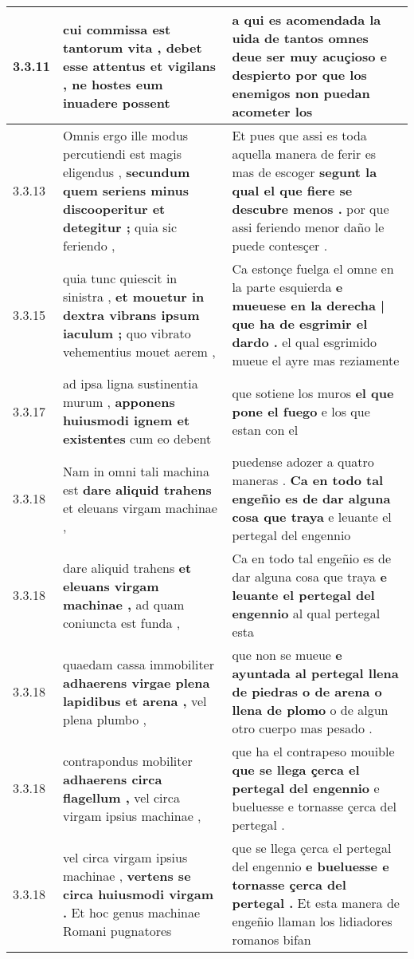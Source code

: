 \begin{tabular}{|p{1cm}|p{6.5cm}|p{6.5cm}|}
3.3.11 & cui commissa est tantorum vita , \textbf{ debet esse attentus et vigilans , } ne hostes eum inuadere possent & a qui es acomendada la uida de tantos omnes \textbf{ deue ser muy acuçioso e despierto } por que los enemigos non puedan acometer los \\\hline
3.3.13 & Omnis ergo ille modus percutiendi est magis eligendus , \textbf{ secundum quem seriens minus discooperitur et detegitur ; } quia sic feriendo , & Et pues que assi es toda aquella manera de ferir es mas de escoger \textbf{ segunt la qual el que fiere se descubre menos . } por que assi feriendo menor daño le puede contesçer . \\\hline
3.3.15 & quia tunc quiescit in sinistra , \textbf{ et mouetur in dextra vibrans ipsum iaculum ; } quo vibrato vehementius mouet aerem , & Ca estonçe fuelga el omne en la parte esquierda \textbf{ e mueuese en la derecha | que ha de esgrimir el dardo . } el qual esgrimido mueue el ayre mas reziamente \\\hline
3.3.17 & ad ipsa ligna sustinentia murum , \textbf{ apponens huiusmodi ignem et existentes } cum eo debent & que sotiene los muros \textbf{ el que pone el fuego } e los que estan con el \\\hline
3.3.18 & Nam in omni tali machina est \textbf{ dare aliquid trahens } et eleuans virgam machinae , & puedense adozer a quatro maneras . \textbf{ Ca en todo tal engeñio es de dar alguna cosa que traya } e leuante el pertegal del engennio \\\hline
3.3.18 & dare aliquid trahens \textbf{ et eleuans virgam machinae , } ad quam coniuncta est funda , & Ca en todo tal engeñio es de dar alguna cosa que traya \textbf{ e leuante el pertegal del engennio } al qual pertegal esta \\\hline
3.3.18 & quaedam cassa immobiliter \textbf{ adhaerens virgae plena lapidibus et arena , } vel plena plumbo , & que non se mueue \textbf{ e ayuntada al pertegal llena de piedras o de arena o llena de plomo } o de algun otro cuerpo mas pesado . \\\hline
3.3.18 & contrapondus mobiliter \textbf{ adhaerens circa flagellum , } vel circa virgam ipsius machinae , & que ha el contrapeso mouible \textbf{ que se llega çerca el pertegal del engennio } e bueluesse e tornasse çerca del pertegal . \\\hline
3.3.18 & vel circa virgam ipsius machinae , \textbf{ vertens se circa huiusmodi virgam . } Et hoc genus machinae Romani pugnatores & que se llega çerca el pertegal del engennio \textbf{ e bueluesse e tornasse çerca del pertegal . } Et esta manera de engeñio llaman los lidiadores romanos bifan \\\hline

\end{tabular}
